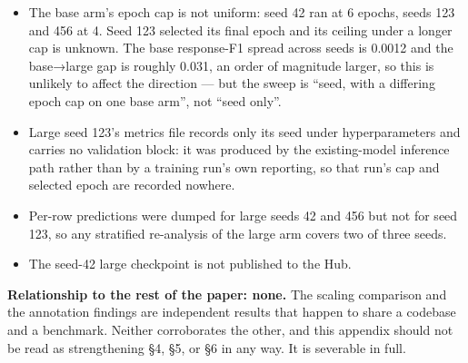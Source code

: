 \documentclass[11pt]{article}
\providecommand{\tightlist}{\setlength{\itemsep}{0pt}\setlength{\parskip}{0pt}}
\newcounter{none}
\begin{document}
\begin{itemize}
\tightlist
\item
  The base arm's epoch cap is not uniform: seed 42 ran at 6 epochs, seeds 123 and 456 at 4.
  Seed 123 selected its final epoch and its ceiling under a longer cap is unknown. The base
  response-F1 spread across seeds is 0.0012 and the base→large gap is roughly 0.031, an
  order of magnitude larger, so this is unlikely to affect the direction --- but the sweep is
  ``seed, with a differing epoch cap on one base arm'', not ``seed only''.
\item
  Large seed 123's metrics file records only its seed under hyperparameters and carries no
  validation block: it was produced by the existing-model inference path rather than by a
  training run's own reporting, so that run's cap and selected epoch are recorded nowhere.
\item
  Per-row predictions were dumped for large seeds 42 and 456 but not for seed 123, so any
  stratified re-analysis of the large arm covers two of three seeds.
\item
  The seed-42 large checkpoint is not published to the Hub.
\end{itemize}

\textbf{Relationship to the rest of the paper: none.} The scaling comparison and the annotation
findings are independent results that happen to share a codebase and a benchmark. Neither
corroborates the other, and this appendix should not be read as strengthening §4, §5, or §6
in any way. It is severable in full.
\end{document}
